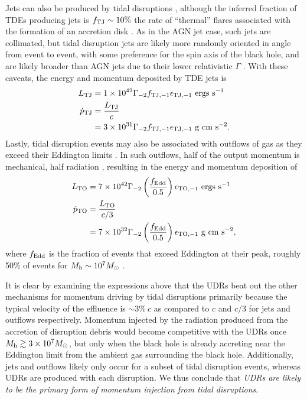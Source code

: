 \documentclass[preprint2]{aastex}
\begin{document}
Jets can also be produced by tidal disruptions \citep{Bloom:2011a}, although the inferred fraction of TDEs producing jets is $f_{\rm TJ} \sim 10\%$ the rate of ``thermal'' flares associated with the formation of an accretion disk \citep{Cenko:2012b}. As in the AGN jet case, such jets are collimated, but tidal disruption jets are likely more randomly oriented in angle from event to event, with some preference for the spin axis of the black hole, and are likely broader than AGN jets due to their lower relativistic $\Gamma$ \citep{Tchekhovskoy:2014a}. With these caveats, the energy and momentum deposited by TDE jets is
\begin{align}
L_{\rm TJ}  &= 1 \times 10^{42} \Gamma_{-2} f_{\rm TJ,-1} \epsilon_{\rm TJ,-1}~{\rm ergs~s}^{-1}\\
\dot{p}_{\rm TJ}  &= \frac{ L_{\rm TJ} }{c}\nonumber\\
&=3 \times 10^{31} \Gamma_{-2} f_{\rm TJ,-1} \epsilon_{\rm TJ,-1}~{\rm g~cm~s}^{-2}.
\end{align}
Lastly, tidal disruption events may also be associated with outflows of gas as they exceed their Eddington limits \citep{Metzger:2015a,Alexander:2016a,Jiang:2016b}. In such outflows, half of the output momentum is mechanical, half radiation \citep{Jiang:2014a}, resulting in the energy and momentum deposition of
\begin{align}
L_{\rm TO}  &= 7 \times 10^{42} \Gamma_{-2} \left(\frac{f_{\rm Edd}}{0.5}\right)\epsilon_{\rm TO,-1}~{\rm ergs~s}^{-1}\\
 \dot{p}_{\rm TO} &= \frac{ L_{\rm TO} }{c/3}\nonumber\\
&= 7 \times 10^{32} \Gamma_{-2} \left(\frac{f_{\rm Edd}}{0.5}\right)\epsilon_{\rm TO,-1}~{\rm g~cm~s}^{-2},
\end{align}
where $f_{\rm Edd}$ is the fraction of events that exceed Eddington at their peak, roughly 50\% of events for $M_{\rm h} \sim 10^{7} M_{\odot}$ \citep{Guillochon:2015b}.

It is clear by examining the expressions above that the UDRs beat out the other mechanisms for momentum driving by tidal disruptions primarily because the typical velocity of the effluence is $\sim 3\%~c$ as compared to $c$ and $c/3$ for jets and outflows respectively. Momentum injected by the radiation produced from the accretion of disruption debris would become competitive with the UDRs once $M_{\rm h} \gtrsim 3 \times 10^{7} M_{\odot}$, but only when the black hole is already accreting near the Eddington limit from the ambient gas surrounding the black hole. Additionally, jets and outflows likely only occur for a subset of tidal disruption events, whereas UDRs are produced with each disruption. We thus conclude that {\it UDRs are likely to be the primary form of momentum injection from tidal disruptions}.
\end{document}
